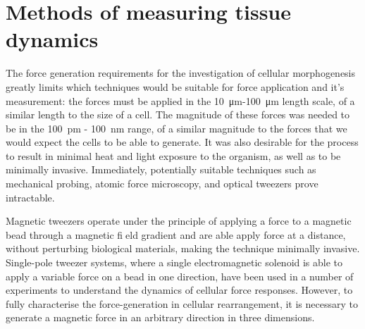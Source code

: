 \section{Methods of measuring tissue dynamics}
The force generation requirements for the investigation of cellular morphogenesis greatly limits which techniques would be suitable for force application and it's measurement: the forces must be applied in the \SI{10}{\micro\meter}-\SI{100}{\micro\meter} length scale, of a similar length to the size of a cell.
The magnitude of these forces was needed to be in the \SI{100}{\pico\meter} - \SI{100}{\nano\meter} range, of a similar magnitude to the forces that we would expect the cells to be able to generate. \cite{}
It was also desirable for the process to result in minimal heat and light exposure to the organism, as well as to be minimally invasive.
Immediately, potentially suitable techniques such as mechanical probing, atomic force microscopy, and optical tweezers prove intractable.

Magnetic tweezers operate under the principle of applying a force to a magnetic bead through a magnetic field gradient and are able apply force at a distance, without perturbing biological materials, making the technique minimally invasive.
Single-pole tweezer systems, where a single electromagnetic solenoid is able to apply a variable force on a bead in one direction, have been used in a number of experiments to understand the dynamics of cellular force responses. \cite{}
However, to fully characterise the force-generation in cellular rearrangement, it is necessary to generate a magnetic force in an arbitrary direction in three dimensions.


